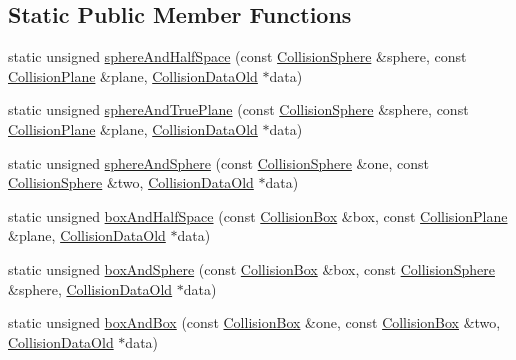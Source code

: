 \subsection*{Static Public Member Functions}
\begin{DoxyCompactItemize}
\item 
static unsigned \mbox{\hyperlink{classr3_1_1_collision_detector_old_afac2bf8c0034f33fee66979d69da76e7}{sphere\+And\+Half\+Space}} (const \mbox{\hyperlink{classr3_1_1_collision_sphere}{Collision\+Sphere}} \&sphere, const \mbox{\hyperlink{classr3_1_1_collision_plane}{Collision\+Plane}} \&plane, \mbox{\hyperlink{classr3_1_1_collision_data_old}{Collision\+Data\+Old}} $\ast$data)
\item 
static unsigned \mbox{\hyperlink{classr3_1_1_collision_detector_old_ac193fb110bfd2618ed61aa59b72c6877}{sphere\+And\+True\+Plane}} (const \mbox{\hyperlink{classr3_1_1_collision_sphere}{Collision\+Sphere}} \&sphere, const \mbox{\hyperlink{classr3_1_1_collision_plane}{Collision\+Plane}} \&plane, \mbox{\hyperlink{classr3_1_1_collision_data_old}{Collision\+Data\+Old}} $\ast$data)
\item 
static unsigned \mbox{\hyperlink{classr3_1_1_collision_detector_old_a947191d7a2503e4475d3a9098009601e}{sphere\+And\+Sphere}} (const \mbox{\hyperlink{classr3_1_1_collision_sphere}{Collision\+Sphere}} \&one, const \mbox{\hyperlink{classr3_1_1_collision_sphere}{Collision\+Sphere}} \&two, \mbox{\hyperlink{classr3_1_1_collision_data_old}{Collision\+Data\+Old}} $\ast$data)
\item 
static unsigned \mbox{\hyperlink{classr3_1_1_collision_detector_old_ad1fa9c247235130c96432fc3f5524e8f}{box\+And\+Half\+Space}} (const \mbox{\hyperlink{classr3_1_1_collision_box}{Collision\+Box}} \&box, const \mbox{\hyperlink{classr3_1_1_collision_plane}{Collision\+Plane}} \&plane, \mbox{\hyperlink{classr3_1_1_collision_data_old}{Collision\+Data\+Old}} $\ast$data)
\item 
static unsigned \mbox{\hyperlink{classr3_1_1_collision_detector_old_a16fabd7a2ded98f3cb7694f853724541}{box\+And\+Sphere}} (const \mbox{\hyperlink{classr3_1_1_collision_box}{Collision\+Box}} \&box, const \mbox{\hyperlink{classr3_1_1_collision_sphere}{Collision\+Sphere}} \&sphere, \mbox{\hyperlink{classr3_1_1_collision_data_old}{Collision\+Data\+Old}} $\ast$data)
\item 
static unsigned \mbox{\hyperlink{classr3_1_1_collision_detector_old_afd98d9fbaa8ace5bb239a2a2da08aace}{box\+And\+Box}} (const \mbox{\hyperlink{classr3_1_1_collision_box}{Collision\+Box}} \&one, const \mbox{\hyperlink{classr3_1_1_collision_box}{Collision\+Box}} \&two, \mbox{\hyperlink{classr3_1_1_collision_data_old}{Collision\+Data\+Old}} $\ast$data)
\end{DoxyCompactItemize}


